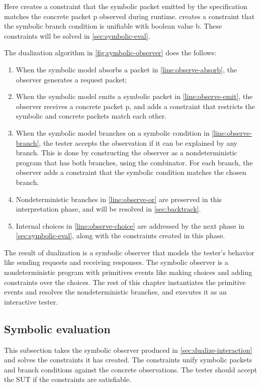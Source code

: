 Here  creates a constraint that the symbolic packet 
emitted by the specification matches the concrete packet \ilc p observed during
runtime.   creates a constraint that the symbolic branch
condition  is unifiable with boolean value \ilc b.  These constraints
will be solved in \autoref{sec:symbolic-eval}.

The dualization algorithm in \autoref{fig:symbolic-observer} does the follows:
\begin{enumerate}
  \item When the symbolic model absorbs a packet in
    \autoref{line:observe-absorb}, the observer generates a request packet;
  \item When the symbolic model emits a symbolic packet  in
    \autoref{line:observe-emit}, the observer receives a concrete packet \ilc p,
    and adds a constraint that restricts the symbolic and concrete packets match
    each other.
  \item When the symbolic model branches on a symbolic condition  in
    \autoref{line:observe-branch}, the tester accepts the observation if it can
    be explained by any branch.  This is done by constructing the observer as a
    nondeterministic program that has both branches, using the 
    combinator.  For each branch, the observer adds a constraint that the
    symbolic condition matches the chosen branch.
  \item Nondeterministic branches in \autoref{line:observe-or} are preserved in
    this interpretation phase, and will be resolved in \autoref{sec:backtrack}.
  \item Internal choices in \autoref{line:observe-choice} are addressed by the
    next phase in \autoref{sec:symbolic-eval}, along with the constraints
    created in this phase.
\end{enumerate}

The result of dualization is a symbolic observer that models the tester's
behavior like sending requests and receiving responses.  The symbolic observer
is a nondeterministic program with primitives events like making choices and
adding constraints over the choices.  The rest of this chapter instantiates the
primitive events and resolves the nondeterministic branches, and executes it as
an interactive tester.

\subsection{Symbolic evaluation}
\label{sec:symbolic-eval}
This subsection takes the symbolic observer produced in
\autoref{sec:dualize-interaction} and solves the constraints it has created.
The constraints unify symbolic packets and branch conditions against the
concrete observations.  The tester should accept the SUT if the constraints are
satisfiable.

